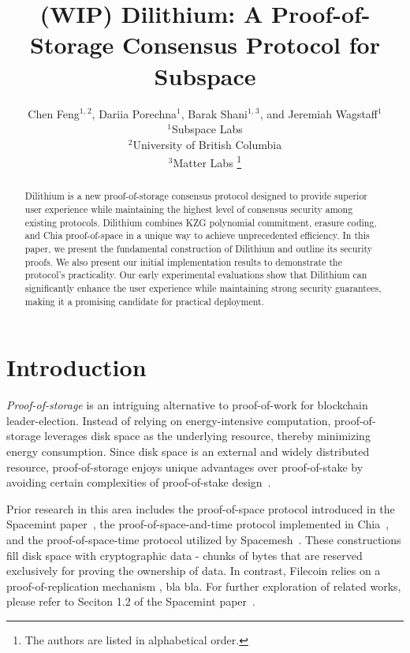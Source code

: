 \documentclass[conference]{IEEEtran}
\title{(WIP) Dilithium: A Proof-of-Storage Consensus Protocol for Subspace}
\author{Chen Feng$^{1,}$$^{ 2}$, Dariia Porechna$^{1}$, Barak Shani$^{1,}$$^{ 3}$, and Jeremiah Wagstaff$^{1}$\\
$^1$Subspace Labs\\
$^2$University of British Columbia\\
$^3$Matter Labs
\thanks{The authors are listed in alphabetical order.}}
\begin{document}
\maketitle

\begin{abstract}
    Dilithium is a new proof-of-storage consensus protocol designed to provide superior
    user experience while maintaining the highest level 
    of consensus security among existing protocols.
    Dilithium combines KZG polynomial commitment, erasure coding, and Chia proof-of-space
    in a unique way to achieve unprecedented efficiency. 
    In this paper, we present the fundamental construction of Dilithium
    and outline its security proofs. We also present our initial implementation results to demonstrate the protocol's practicality.
    Our early experimental evaluations show that Dilithium can significantly enhance the user experience while maintaining strong security guarantees, making it a promising candidate for practical deployment.
\end{abstract}

\section{Introduction}

\textit{Proof-of-storage} is an intriguing alternative to proof-of-work for blockchain leader-election. 
Instead of relying on energy-intensive computation, proof-of-storage leverages disk space as the underlying resource, 
thereby minimizing energy consumption. Since disk space is an external and widely distributed resource, 
proof-of-storage enjoys unique advantages over proof-of-stake by avoiding certain complexities of proof-of-stake design~\cite{blockchain_resources}.

Prior research in this area includes the proof-of-space protocol introduced in the Spacemint paper~\cite{spacemint}, the proof-of-space-and-time protocol 
implemented in Chia~\cite{chia}, and the proof-of-space-time protocol utilized by Spacemesh~\cite{spacemesh}.
These constructions fill disk space with cryptographic data - chunks of bytes that are 
reserved exclusively for proving the ownership of data. 
In contrast, Filecoin relies on a proof-of-replication mechanism  \cite{proof_of_replication_BFisch}, bla bla. For further exploration of related works, please refer to Seciton 1.2 of the Spacemint paper~\cite{spacemint}.

\end{document}
